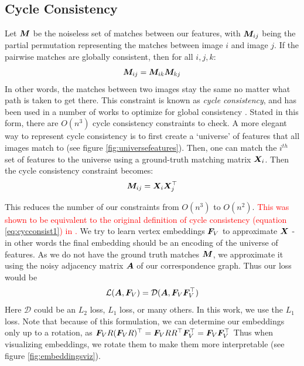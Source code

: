 \documentclass{article} %
\begin{document}
\subsection{Cycle Consistency} \label{sec:cycconsist}

Let ${\bm{M}}$ be the noiseless set of matches between our features, with ${\bm{M}}_{ij}$ being the partial permutation representing the matches between image $i$ and image $j$.
If the pairwise matches are globally consistent, then for all $i, j, k$:
\begin{equation}
{\bm{M}}_{ij} = {\bm{M}}_{ik} {\bm{M}}_{kj}
\label{eq:cycconsist1}
\end{equation}
In other words, the matches between two images stay the same no matter what path is taken to get there. 
This constraint is known as \textit{cycle consistency}, and has been used in a number of works to optimize for global consistency \cite{zhou2015multi, wang2017multi, leonardos2016distributed}.
Stated in this form, there are $O(n^3)$ cycle consistency constraints to check.
A more elegant way to represent cycle consistency is to first create a `universe' of features that all images match to (see figure \ref{fig:universefeatures}).
Then, one can match the $i^{th}$ set of features to the universe using a ground-truth matching matrix ${\bm{X}}_i$.
Then the cycle consistency constraint becomes:
\begin{equation}
{\bm{M}}_{ij} = {\bm{X}}_{i}{\bm{X}}_{j}^\top
\label{eq:cycconsist2}
\end{equation}

This reduces the number of our constraints from $O(n^3)$ to $O(n^2)$.
\textcolor{red}{This was shown to be equivalent to the original definition of cycle consistency (equation \ref{eq:cycconsist1}) in \cite{huang2013consistent}.}
We try to learn vertex embeddings ${\bm{F}}_V$ to approximate ${\bm{X}}$ - in other words the final embedding should be an encoding of the universe of features.
As we do not have the ground truth matches ${\bm{M}}$, we approximate it using the noisy adjacency matrix ${\bm{A}}$ of our correspondence graph. Thus our loss would be 
\begin{equation}
\mathcal{L}({\bm{A}}, {\bm{F}}_V) = \mathcal{D}({\bm{A}}, {\bm{F}}_V {\bm{F}}_V^\top)
\end{equation}
Here $\mathcal{D}$ could be an $L_2$ loss, $L_1$ loss, or many others. In this work, we use the $L_1$ loss. 
Note that because of this formulation, we can determine our embeddings only up to a rotation, as
$ {\bm{F}}_V R({\bm{F}}_V R)^\top
= {\bm{F}}_V RR^\top {\bm{F}}_V^\top
= {\bm{F}}_V{\bm{F}}_V^\top
\label{eq:rotinvar} $
Thus when visualizing embeddings, we rotate them to make them more interpretable (see figure \ref{fig:embeddingsviz}).
\end{document}
